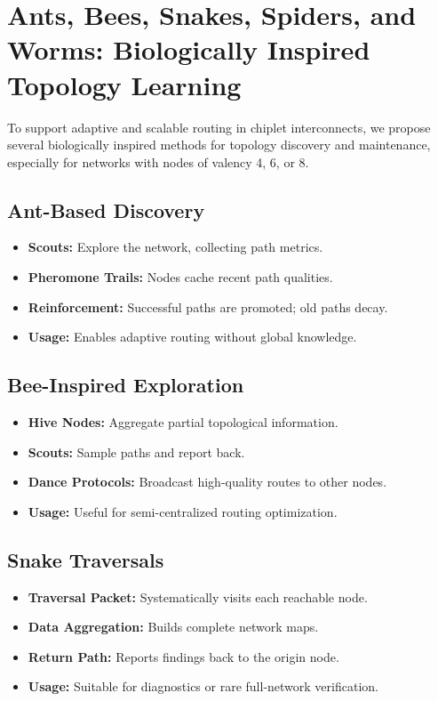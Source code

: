 \documentclass[../OAE-SPEC-MAIN.tex]{subfiles}
\begin{document}
\section{Ants, Bees, Snakes, Spiders, and Worms: Biologically Inspired Topology Learning}

To support adaptive and scalable routing in chiplet interconnects, we propose several biologically inspired methods for topology discovery and maintenance, especially for networks with nodes of valency 4, 6, or 8.

\subsection{Ant-Based Discovery}

\begin{itemize}
\item \textbf{Scouts:} Explore the network, collecting path metrics.
\item \textbf{Pheromone Trails:} Nodes cache recent path qualities.
\item \textbf{Reinforcement:} Successful paths are promoted; old paths decay.
\item \textbf{Usage:} Enables adaptive routing without global knowledge.
\end{itemize}

\subsection{Bee-Inspired Exploration}

\begin{itemize}
\item \textbf{Hive Nodes:} Aggregate partial topological information.
\item \textbf{Scouts:} Sample paths and report back.
\item \textbf{Dance Protocols:} Broadcast high-quality routes to other nodes.
\item \textbf{Usage:} Useful for semi-centralized routing optimization.
\end{itemize}

\subsection{Snake Traversals}

\begin{itemize}
\item \textbf{Traversal Packet:} Systematically visits each reachable node.
\item \textbf{Data Aggregation:} Builds complete network maps.
\item \textbf{Return Path:} Reports findings back to the origin node.
\item \textbf{Usage:} Suitable for diagnostics or rare full-network verification.
\end{itemize}
\end{document}
